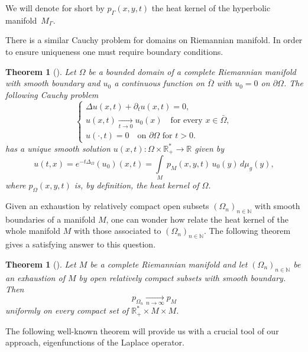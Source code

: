 \documentclass[10pt]{amsart}
\theoremstyle{plain}
\newtheorem{theoreme}[equation]{Theorem}
\theoremstyle{definition}
\newcommand{\RR}{\mathbb{R}}
\newcommand{\NN}{\mathbb{N}}
\newcommand{\inte}[1]{\underset{#1}{\int}}
\newcommand{\tends}[1]{\underset{#1}{\longrightarrow}}
\begin{document}
We will denote for short by $p_{\Gamma}(x,y,t)$ the heat kernel of the hyperbolic manifold~$M_{\Gamma}$.

There is a similar Cauchy problem for domains on Riemannian manifold. In order to ensure uniqueness one must require boundary conditions.

\begin{theoreme}[{\cite[p.\,168]{livrechavel}}]
\label{theocauchyprobleml2}
Let $\Omega$ be a bounded domain of a complete Riemannian manifold with smooth boundary and $u_0$ a continuous function on $\bar{\Omega}$ with $u_0 = 0$ on $\partial \Omega$. The following Cauchy problem\vspace*{-3pt}
\begin{equation}
\label{eq Cauchy problem2}
\begin{cases}
\Delta u(x,t) + \partial_t u(x,t) = 0, \\
u(x,t) \tends{t \to 0} u_0(x) \quad\text{for every } x \in \bar{\Omega}, \\
u(\cdot,t) = 0 \quad \text{on } \partial \Omega \text{ for } t > 0.
\end{cases}
\end{equation}
has a unique smooth solution $u(x,t) : \Omega \times \RR_+^* \to \RR$ given by\vspace*{-3pt}
\[
u(t,x) = e^{-t \Delta_{\Omega}}(u_0)(x,t) = \inte{M} \, p_M(x,y,t) \, u_0(y) \,d \mu_{g}(y),
\]
where $p_{\Omega}(x,y,t)$ is, by definition, the \emph{heat kernel} of $\Omega$.
\end{theoreme}

Given an exhaustion by relatively compact open subsets $(\Omega_n)_{n \in \NN}$ with smooth boundaries of a manifold $M$, one can wonder how relate the heat kernel of the whole manifold $M$ with those associated to $(\Omega_n)_{n \in \NN}$. The following theorem gives a satisfying answer to this question.

\begin{theoreme}[{\cite[Th.\,3.6]{artdodziuk}}]
\label{theododziuk}
Let $M$ be a complete Riemannian manifold and let $(\Omega_n)_{n \in \NN}$ be an exhaustion of $M$ by open relatively compact subsets with smooth boundary. Then
\[
p_{\Omega_n} \tends{n \to \infty} p_M
\]
uniformly on every compact set of $\RR^*_+ \times M \times M$.
\end{theoreme}

The following well-known theorem will provide us with a crucial tool of our approach, eigenfunctions of the Laplace operator.
\end{document}
